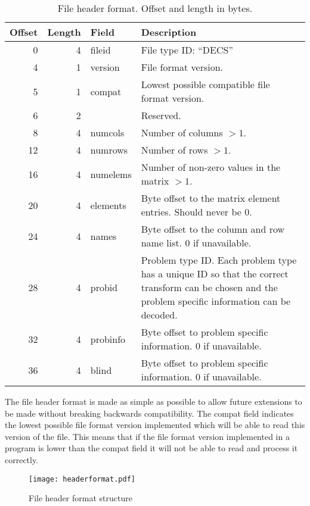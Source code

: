 \begin{table}[htbp]
	\centering
	\begin{tabular}{|r|r|l|p{2.7in}|}
		\hline
		\bf Offset & \bf Length & \bf Field & \bf Description \\ \hline
		0  & 4 & fileid & File type ID: ``DECS'' \\ \hline
		4  & 1 & version & File format version. \\ \hline
		5  & 1 & compat & Lowest possible compatible file format version. \\ \hline
		6  & 2 & & Reserved. \\ \hline
		8  & 4 & numcols & Number of columns $> 1$. \\ \hline
		12 & 4 & numrows & Number of rows $> 1$. \\ \hline
		16 & 4 & numelems & Number of non-zero values in the matrix $> 1$. \\ \hline
		20 & 4 & elements & Byte offset to the matrix element entries. Should never be 0. \\ \hline
		24 & 4 & names & Byte offset to the column and row name list. 0 if unavailable. \\ \hline
		28 & 4 & probid & Problem type ID. Each problem type has a unique ID so that the correct transform can be chosen and the problem specific information can be decoded. \\ \hline
		32 & 4 & probinfo & Byte offset to problem specific information. 0 if unavailable. \\ \hline
		36 & 4 & blind & Byte offset to problem specific information. 0 if unavailable. \\ \hline
	\end{tabular}
	\caption{File header format. Offset and length in bytes.}
	\label{tab:header}
\end{table}

The file header format is made as simple as possible to allow future extensions to be made without breaking backwards compatibility.
The compat field indicates the lowest possible file format version implemented which will be able to read this version of the file.
This means that if the file format version implemented in a program is lower than the compat field it will not be able to read and process it correctly.

\begin{figure}[htb]
	\centering
	\texttt{[image: headerformat.pdf]}
	\caption{File header format structure}
	\label{fig:header}
\end{figure}


